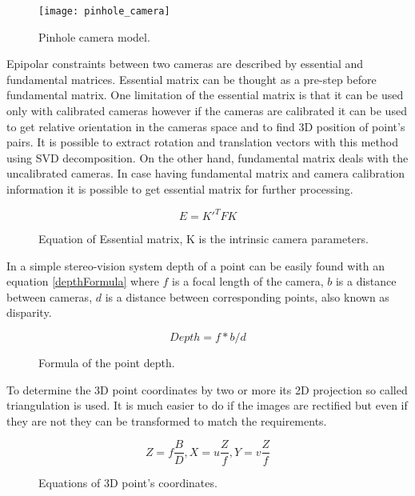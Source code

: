 \documentclass[../../../../main]{subfiles}
\begin{document}
\begin{figure} [ht]
    \begin{center}
        \texttt{[image: pinhole\_camera]}
        \caption{Pinhole camera model.}
        \label{fig:pinholeCamera}
    \end{center}
\end{figure}

Epipolar constraints between two cameras are described by essential and fundamental matrices. Essential matrix can be thought as a pre-step before fundamental matrix. One limitation of the essential matrix is that it can be used only with calibrated cameras however if the cameras are calibrated it can be used to get relative orientation in the cameras space and to find 3D position of point's pairs. It is possible to extract rotation and translation vectors with this method using \ac{SVD} decomposition. On the other hand, fundamental matrix deals with the uncalibrated cameras. In case having fundamental matrix and camera calibration information it is possible to get essential matrix for further processing. 

\begin{figure} [ht]
  \centering  
      \begin{equation}
         E = K'^TFK  
      \end{equation}
  \caption{Equation of Essential matrix, K is the intrinsic camera parameters. \parencite[see][p257]{Hartley2004}}
\end{figure}

In a simple stereo-vision system depth of a point can be easily found with an equation \ref{depthFormula} where $f$ is a focal length of the camera, $b$ is a distance between cameras, $d$ is a distance between corresponding points, also known as disparity.

\begin{figure} [ht]
  \centering  
      \begin{equation}
         Depth = f * b/d
         \label{depthFormula}
      \end{equation}
  \caption{Formula of the point depth.}
\end{figure}

To determine the 3D point coordinates by two or more its 2D projection so called triangulation is used. It is much easier to do if the images are rectified but even if they are not they can be transformed to match the requirements.

\begin{figure} [ht!]
  \centering  
      \begin{equation}
         Z = f\frac{B}{D}, X = u\frac{Z}{f}, Y = v\frac{Z}{f}
         \label{realCoordinatesFormula}
      \end{equation}
  \caption{Equations of 3D point's coordinates.}
\end{figure}
\end{document}
